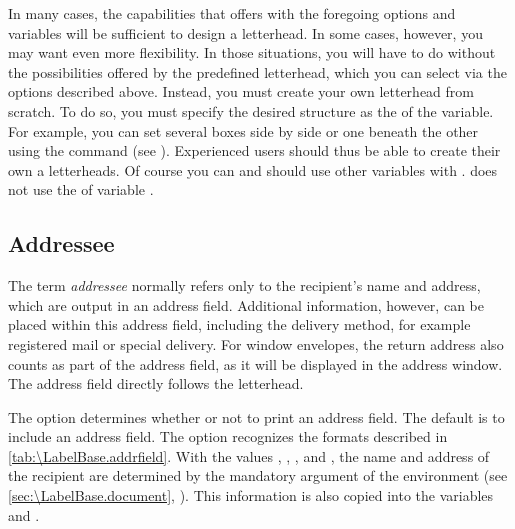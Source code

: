 \begin{Declaration}
\end{Declaration}
In many cases, the capabilities that  offers with the
foregoing options and variables will be sufficient to design a letterhead. In
some cases, however, you may want even more flexibility. In those situations,
you will have to do without the possibilities offered by the predefined
letterhead, which you can select via the options described above. Instead, you
must create your own letterhead from scratch. To do so, you must specify the
desired structure as the  of the 
variable. For example, you can set several boxes side by side or one beneath
the other using the  command (see \cite{latex:usrguide-historic}).
Experienced users should thus be able to create their own a letterheads. Of
course you can and should use other variables with
. \KOMAScript{} does not use the
 of variable . %
\EndIndexGroup
%
\EndIndexGroup


\subsection{Addressee}
%
\BeginIndexGroup
{}

The term \emph{addressee} normally refers only to the recipient's name and
address, which are output in an address field. Additional information,
however, can be placed within this address field, including the delivery
method, for example registered mail or special delivery. For window envelopes,
the return address also counts as part of the address field, as it will be
displayed in the address window. The address field directly follows the
letterhead.

\begin{Declaration}
\end{Declaration}%
%
The  option determines whether or not to print an address
field. The default is to include an address field. The
option recognizes the formats described in
\autoref{tab:\LabelBase.addrfield}. With
the values ,
, , and , the name and
address of the recipient are determined by the mandatory argument of the
 environment (see
\autoref{sec:\LabelBase.document}, ). This
information is also copied into the variables  and
.

